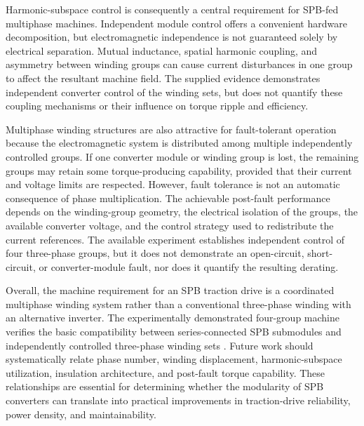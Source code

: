 Harmonic-subspace control is consequently a central requirement for SPB-fed multiphase machines. Independent module control offers a convenient hardware decomposition, but electromagnetic independence is not guaranteed solely by electrical separation. Mutual inductance, spatial harmonic coupling, and asymmetry between winding groups can cause current disturbances in one group to affect the resultant machine field. The supplied evidence demonstrates independent converter control of the winding sets, but does not quantify these coupling mechanisms or their influence on torque ripple and efficiency. %

Multiphase winding structures are also attractive for fault-tolerant operation because the electromagnetic system is distributed among multiple independently controlled groups. If one converter module or winding group is lost, the remaining groups may retain some torque-producing capability, provided that their current and voltage limits are respected. However, fault tolerance is not an automatic consequence of phase multiplication. The achievable post-fault performance depends on the winding-group geometry, the electrical isolation of the groups, the available converter voltage, and the control strategy used to redistribute the current references. The available experiment establishes independent control of four three-phase groups, but it does not demonstrate an open-circuit, short-circuit, or converter-module fault, nor does it quantify the resulting derating. %

Overall, the machine requirement for an SPB traction drive is a coordinated multiphase winding system rather than a conventional three-phase winding with an alternative inverter. The experimentally demonstrated four-group machine verifies the basic compatibility between series-connected SPB submodules and independently controlled three-phase winding sets \cite{Jin2017}. Future work should systematically relate phase number, winding displacement, harmonic-subspace utilization, insulation architecture, and post-fault torque capability. These relationships are essential for determining whether the modularity of SPB converters can translate into practical improvements in traction-drive reliability, power density, and maintainability.